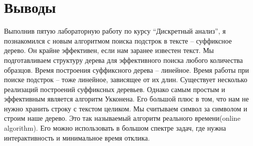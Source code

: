 \section{Выводы}
Выполнив пятую лабораторную работу по курсу \enquote{Дискретный анализ}, я познакомился с новым алгоритмом поиска подстрок в тексте -- суффиксное дерево. Он крайне эффективен, если нам заранее известен текст. Мы подготавливаем структуру дерева для эффективного поиска любого количества образцов. Время построения суффиксного дерева -- линейное. Время работы при поиске подстрок -- тоже линейное, зависящее от их длин. Существует несколько реализаций построений суффиксных деревьев. Однако самым простым и эффективным является алгоритм Укконена. Его большой плюс в том, что нам не нужно хранить строку с текстом целиком. Мы считываем символ за символом и строим наше дерево. Это так называемый алгоритм реального времени(online algorithm). Его можно использовать в большом спектре задач, где нужна интерактивность и минимальное время отклика. 
\pagebreak